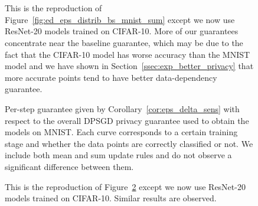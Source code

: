 \begin{figure}[t]
\centering
{}
\\
\\
\caption{This is the reproduction of Figure~\ref{fig:ed_eps_distrib_bs_mnist_sum} except we now use ResNet-20 models trained on CIFAR-10. More of our guarantees concentrate near the baseline guarantee, which may be due to the fact that the CIFAR-10 model has worse accuracy than the MNIST model and we have shown in Section~\ref{ssec:exp_better_privacy} that more accurate points tend to have better data-dependency guarantee.
}
\label{fig:ed_eps_distrib_bs_cifar_sum}
\end{figure}


\begin{figure}[t]
\centering
{}
\caption{
Per-step guarantee given by Corollary~\ref{cor:eps_delta_sens} with respect to the overall DPSGD privacy guarantee used to obtain the models on MNIST. Each curve corresponds to a certain training stage and whether the data points are correctly classified or not. We include both mean and sum update rules and do not observe a significant difference between them.
}
\label{fig:ed_eps_curve_vary_eps_mnist}
\end{figure}

\begin{figure}[t]
\centering
{}
\caption{This is the reproduction of Figure~\ref{fig:ed_eps_curve_vary_eps_mnist} except we now use ResNet-20 models trained on CIFAR-10. Similar results are observed.
}
\label{fig:ed_eps_curve_vary_eps_cifar}
\end{figure}

